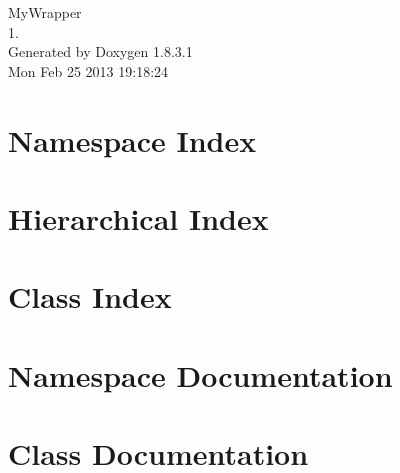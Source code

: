 \documentclass{book}
\begin{document}
\hypersetup{pageanchor=false,citecolor=blue}
\begin{titlepage}
\vspace*{7cm}
\begin{center}
{\Large My\-Wrapper \\[1ex]\large 1. }\\
\vspace*{1cm}
{\large Generated by Doxygen 1.8.3.1}\\
\vspace*{0.5cm}
{\small Mon Feb 25 2013 19:18:24}\\
\end{center}
\end{titlepage}
\clearemptydoublepage
{}
\tableofcontents
\clearemptydoublepage
{}
\hypersetup{pageanchor=true,citecolor=blue}
\chapter{Namespace Index}

\chapter{Hierarchical Index}

\chapter{Class Index}

\chapter{Namespace Documentation}

\chapter{Class Documentation}
















































\printindex
\end{document}
